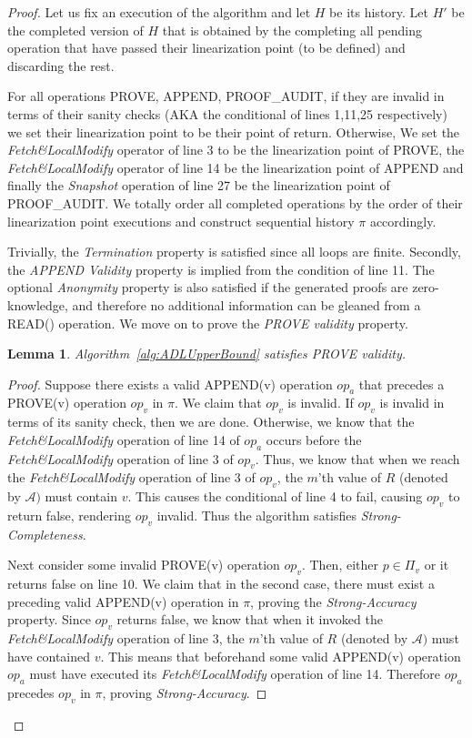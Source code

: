 \documentclass[11pt]{article}
\newtheorem{lemma}{Lemma}
\theoremstyle{definition}
\begin{document}
\begin{proof}
    Let us fix an execution of the algorithm and let $H$ be its history. Let $H'$ be the completed version of $H$ that is obtained by the completing all pending operation that have passed their linearization point (to be defined) and discarding the rest. 

    For all operations PROVE, APPEND, PROOF\_AUDIT, if they are invalid in terms of their sanity checks (AKA the conditional of lines 1,11,25 respectively) we set their linearization point to be their point of return. Otherwise, We set the \textit{Fetch\&LocalModify} operator of line 3 to be the linearization point of PROVE, the \textit{Fetch\&LocalModify} operator of line 14 be the linearization point of APPEND and finally the \textit{Snapshot} operation of line 27 be the linearization point of PROOF\_AUDIT. We totally order all completed operations by the order of their linearization point executions and construct sequential history $\pi$ accordingly.

    Trivially, the \textit{Termination} property is satisfied since all loops are finite. Secondly, the \textit{APPEND Validity} property is implied from the condition of line 11. The optional \textit{Anonymity} property is also satisfied if the generated proofs are zero-knowledge, and therefore no additional information can be gleaned from a READ() operation. 
    We move on to prove the \textit{PROVE validity} property.

    \begin{lemma}
        Algorithm~\ref{alg:ADLUpperBound} satisfies \textit{PROVE validity}.
    \end{lemma}
    \begin{proof}
        Suppose there exists a valid APPEND(v) operation $op_a$ that precedes a PROVE(v) operation $op_v$ in $\pi$. We claim that $op_v$ is invalid. If $op_v$ is invalid in terms of its sanity check, then we are done. Otherwise, we know that the \textit{Fetch\&LocalModify} operation of line 14 of $op_a$ occurs before the  \textit{Fetch\&LocalModify} operation of line 3 of $op_v$. Thus, we know that when we reach the \textit{Fetch\&LocalModify} operation of line 3 of $op_v$, the $m$'th value of $R$ (denoted by $\mathcal{A})$ must contain $v$. This causes the conditional of line 4 to fail, causing $op_v$ to return false, rendering $op_v$ invalid. Thus the algorithm satisfies \textit{Strong-Completeness}.

        Next consider some invalid PROVE(v) operation $op_v$. Then, either $p\in\Pi_v$ or it returns false on line 10. We claim that in the second case, there must exist a preceding valid APPEND(v) operation in $\pi$, proving the \textit{Strong-Accuracy} property. Since $op_v$ returns false, we know that when it invoked the \textit{Fetch\&LocalModify} operation of line 3,  the $m$'th value of $R$ (denoted by $\mathcal{A})$ must have contained $v$. This means that beforehand some valid APPEND(v) operation $op_a$ must have executed its \textit{Fetch\&LocalModify} operation of line 14. Therefore $op_a$ precedes $op_v$ in $\pi$, proving \textit{Strong-Accuracy}.
    \end{proof}
    

\end{proof}
\end{document}
